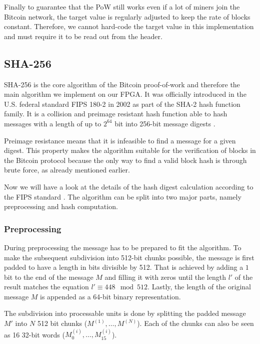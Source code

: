 Finally to guarantee that the PoW still works even if a lot of miners join the Bitcoin network, the target value is regularly adjusted to keep the rate of blocks constant.
Therefore, we cannot hard-code the target value in this implementation and must require it to be read out from the header.

\subsection{SHA-256}
\label{sha256}

SHA-256 is the core algorithm of the Bitcoin proof-of-work and therefore the main algorithm we implement on our FPGA. It was officially introduced in the U.S. federal standard FIPS 180-2 in 2002 as part of the SHA-2 hash function family. 
It is a collision and preimage resistant hash function able to hash messages with a length of up to $2^{64}$ bit into 256-bit message digests \cite{FIPS180-2}. 

Preimage resistance means that it is infeasible to find a message for a given digest. 
This property makes the algorithm suitable for the verification of blocks in the Bitcoin protocol because the only way to find a valid block hash is through brute force, as already mentioned earlier.

Now we will have a look at the details of the hash digest calculation according to the FIPS standard \cite{FIPS180-2}. The algorithm can be split into two major parts, namely preprocessing and hash computation.

\subsubsection*{Preprocessing}

During preprocessing the message has to be prepared to fit the algorithm.
To make the subsequent subdivision into 512-bit chunks possible, the message is first padded to have a length in bits divisible by 512.
That is achieved by adding a $1$ bit to the end of the message $M$ and filling it with zeros until the length $l'$ of the result matches the equation $l' \equiv 448\mod 512$. Lastly, the length of the original message $M$ is appended as a 64-bit binary representation.

The subdivision into processable units is done by splitting the padded message $M'$ into $N$ 512 bit chunks ($M^{(1)},\dots,M^{(N)}$). 
Each of the chunks can also be seen as 16 32-bit words ($M_0^{(i)},\dots,M_{15}^{(i)}$).

